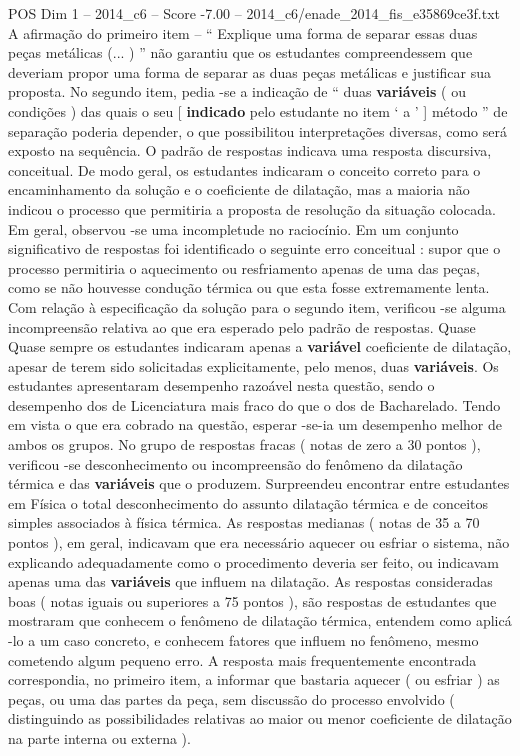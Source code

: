 \begin{textsample}{POS Dim 1 – 2014\_c6 – Score -7.00 – 2014\_c6/enade\_2014\_fis\_e35869ce3f.txt}
A afirmação do primeiro item – “ Explique uma forma de separar essas duas peças metálicas (... ) ” não garantiu que os estudantes compreendessem que deveriam propor uma forma de separar as duas peças metálicas e justificar sua proposta.
No segundo item, pedia -se a indicação de “ duas \textbf{variáveis} ( ou condições ) das quais o seu [ \textbf{indicado} pelo estudante no item ‘ a ’ ] método ” de separação poderia depender, o que possibilitou interpretações diversas, como será exposto na sequência.
O padrão de respostas indicava uma resposta discursiva, conceitual.
De modo geral, os estudantes indicaram o conceito correto para o encaminhamento da solução e o coeficiente de dilatação, mas a maioria não indicou o processo que permitiria a proposta de resolução da situação colocada.
Em geral, observou -se uma incompletude no raciocínio.
Em um conjunto significativo de respostas foi identificado o seguinte erro conceitual : supor que o processo permitiria o aquecimento ou resfriamento apenas de uma das peças, como se não houvesse condução térmica ou que esta fosse extremamente lenta.
Com relação à especificação da solução para o segundo item, verificou -se alguma incompreensão relativa ao que era esperado pelo padrão de respostas.
Quase Quase sempre os estudantes indicaram apenas a \textbf{variável} coeficiente de dilatação, apesar de terem sido solicitadas explicitamente, pelo menos, duas \textbf{variáveis}.
Os estudantes apresentaram desempenho razoável nesta questão, sendo o desempenho dos de Licenciatura mais fraco do que o dos de Bacharelado.
Tendo em vista o que era cobrado na questão, esperar -se-ia um desempenho melhor de ambos os grupos.
No grupo de respostas fracas ( notas de zero a 30 pontos ), verificou -se desconhecimento ou incompreensão do fenômeno da dilatação térmica e das \textbf{variáveis} que o produzem.
Surpreendeu encontrar entre estudantes em Física o total desconhecimento do assunto dilatação térmica e de conceitos simples associados à física térmica.
As respostas medianas ( notas de 35 a 70 pontos ), em geral, indicavam que era necessário aquecer ou esfriar o sistema, não explicando adequadamente como o procedimento deveria ser feito, ou indicavam apenas uma das \textbf{variáveis} que influem na dilatação.
As respostas consideradas boas ( notas iguais ou superiores a 75 pontos ), são respostas de estudantes que mostraram que conhecem o fenômeno de dilatação térmica, entendem como aplicá -lo a um caso concreto, e conhecem fatores que influem no fenômeno, mesmo cometendo algum pequeno erro.
A resposta mais frequentemente encontrada correspondia, no primeiro item, a informar que bastaria aquecer ( ou esfriar ) as peças, ou uma das partes da peça, sem discussão do processo envolvido ( distinguindo as possibilidades relativas ao maior ou menor coeficiente de dilatação na parte interna ou externa ).

\end{textsample}
